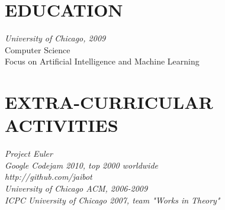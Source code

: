 \documentclass[9pt]{res} %
\begin{document}
\begin{resume}
\section{EDUCATION}

{\sl University of Chicago, 2009} \\
Computer Science \\
Focus on Artificial Intelligence and Machine Learning
 

\section{EXTRA-CURRICULAR \\ ACTIVITIES} 

{\it Project Euler} \\
{\it Google Codejam 2010, top 2000 worldwide} \\
{\it http://github.com/jaibot } \\
{\it University of Chicago ACM, 2006-2009} \\
{\it ICPC University of Chicago 2007, team "Works in Theory"}



\end{resume}
\end{document}
